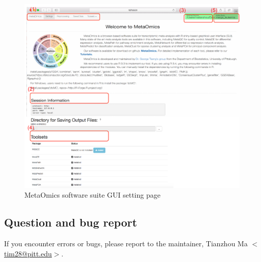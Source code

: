 \begin{figure}[H]
\begin{center}
\includegraphics[scale=0.9]{./figure/preprocessing/GUIsetting}
\caption{MetaOmics software suite GUI setting page}
\label{fig:GUIsetting}
\end{center}
\end{figure}


\subsection{Question and bug report}

If you encounter errors or bugs, please report to the maintainer, 
Tianzhou Ma $<$\url{tim28@pitt.edu}$>$.


 

